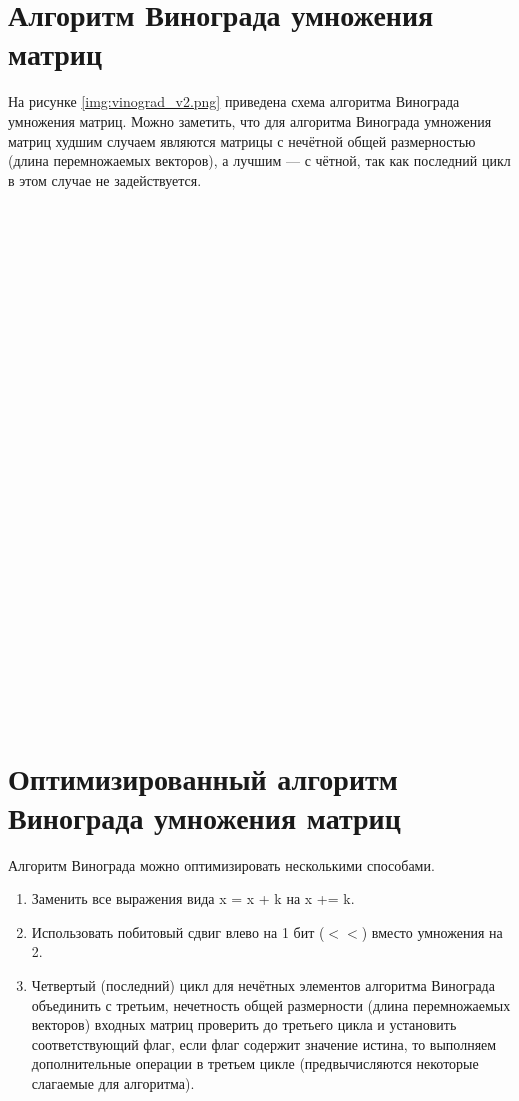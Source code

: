 \section{Алгоритм Винограда умножения матриц}
На рисунке \ref{img:vinograd_v2.png} приведена схема алгоритма Винограда умножения матриц.
Можно заметить, что для алгоритма Винограда умножения матриц худшим случаем являются матрицы с нечётной общей размерностью (длина перемножаемых векторов), а лучшим --- с чётной, так как последний цикл в этом случае не задействуется.
\\
\\
\\
\\
\\
\\
\\
\\
\\
\\
\\
\\
\\
\\
\\
\\
\\
\\
\\
\\
\\
\\
\\
\\
\\
\\
\\
\\



\FloatBarrier
\section{Оптимизированный алгоритм Винограда умножения матриц}
Алгоритм Винограда можно оптимизировать несколькими способами.
\begin{enumerate}[label={\arabic*)}]
	\item Заменить все выражения вида x = x + k на x += k.
	\item Использовать побитовый сдвиг влево на 1 бит ($<<$) вместо умножения на 2.
	\item Четвертый (последний) цикл для нечётных элементов алгоритма Винограда объединить с третьим, нечетность общей размерности (длина перемножаемых векторов) входных матриц проверить до третьего цикла и установить соответствующий флаг, если флаг содержит значение истина, то выполняем дополнительные операции в третьем цикле (предвычисляются некоторые слагаемые для алгоритма).
\end{enumerate}


